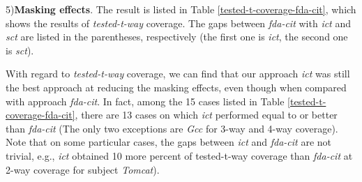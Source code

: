 \documentclass[10pt,journal,compsoc]{IEEEtran}
\begin{document}
5)\textbf{Masking effects}.
The result is listed in Table \ref{tested-t-coverage-fda-cit}, which shows the results of \emph{tested-t-way} coverage. The gaps between \emph{fda-cit} with \emph{ict} and \emph{sct} are listed in the parentheses, respectively (the first one is \emph{ict}, the second one is \emph{sct}).

With regard to \emph{tested-t-way} coverage, we can find that our approach \emph{ict} was still the best approach at reducing the masking effects, even though when compared with approach \emph{fda-cit}. In fact, among the 15 cases listed in Table \ref{tested-t-coverage-fda-cit}, there are 13 cases on which \emph{ict} performed equal to or better than \emph{fda-cit} (The only two exceptions are \emph{Gcc} for 3-way and 4-way coverage). Note that on some particular cases, the gaps between \emph{ict} and \emph{fda-cit} are not trivial, e.g., \emph{ict} obtained 10 more percent of tested-t-way coverage than \emph{fda-cit} at 2-way coverage for subject \emph{Tomcat}).




\end{document}
